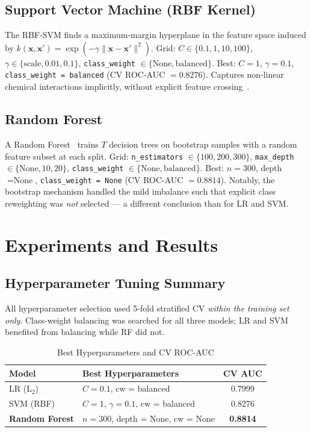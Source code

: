 \documentclass[conference]{IEEEtran}
\begin{document}
\subsection{Support Vector Machine (RBF Kernel)}

The RBF-SVM finds a maximum-margin hyperplane in the feature space
induced by $k(\mathbf{x}, \mathbf{x}') = \exp(-\gamma
\|\mathbf{x}-\mathbf{x}'\|^2)$. Grid: $C \in \{0.1, 1, 10, 100\}$,
$\gamma \in \{\text{scale}, 0.01, 0.1\}$,
\texttt{class\_weight} $\in \{\text{None}, \text{balanced}\}$. Best:
$C = 1$, $\gamma = 0.1$, \texttt{class\_weight = balanced} (CV ROC-AUC
$= 0.8276$). Captures non-linear chemical interactions implicitly,
without explicit feature crossing~\cite{cortes1995}.

\subsection{Random Forest}

A Random Forest~\cite{breiman2001} trains $T$ decision trees on
bootstrap samples with a random feature subset at each split. Grid:
\texttt{n\_estimators} $\in \{100, 200, 300\}$, \texttt{max\_depth}
$\in \{\text{None}, 10, 20\}$, \texttt{class\_weight} $\in
\{\text{None}, \text{balanced}\}$. Best: $n = 300$, depth
$= \text{None}$, \texttt{class\_weight = None} (CV ROC-AUC $= 0.8814$).
Notably, the bootstrap mechanism handled the mild imbalance such that
explicit class reweighting was \emph{not} selected --- a different
conclusion than for LR and SVM.

\section{Experiments and Results}

\subsection{Hyperparameter Tuning Summary}

All hyperparameter selection used 5-fold stratified CV \emph{within the
training set only}. Class-weight balancing was searched for all three
models; LR and SVM benefited from balancing while RF did not.

\begin{table}[h]
\centering
\caption{Best Hyperparameters and CV ROC-AUC}
\label{tab:hyperparams}
\begin{tabular}{l l c}
\toprule
\textbf{Model} & \textbf{Best Hyperparameters} & \textbf{CV AUC} \\
\midrule
LR (L$_2$) & $C = 0.1$, cw = balanced & 0.7999 \\
SVM (RBF) & $C = 1$, $\gamma = 0.1$, cw = balanced & 0.8276 \\
\textbf{Random Forest} & $n = 300$, depth = None, cw = None &
\textbf{0.8814} \\
\bottomrule
\end{tabular}
\end{table}
\end{document}
